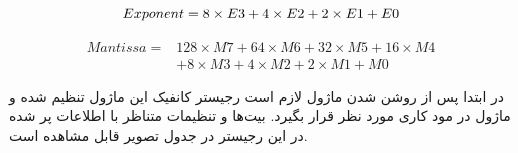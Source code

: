 \begin{fleqn}
	\begin{equation*}
		Exponent = 8\times E3 + 4\times E2 + 2\times E1 + E0\\
	\end{equation*}
\end{fleqn}
\begin{fleqn}
	\begin{equation*}
	\begin{split}
		Mantissa = &128\times M7 + 64\times M6 + 32\times M5 + 16\times M4 \\
					&+ 8\times M3 + 4\times M2 + 2\times M1 + M0
	\end{split}
	\end{equation*}
\end{fleqn}


در ابتدا پس از روشن شدن ماژول لازم است رجیستر‌ کانفیک این ماژول تنظیم شده و ماژول در مود کاری مورد نظر قرار بگیرد. بیت‌ها و تنظیمات متناظر با اطلاعات پر شده در این رجیستر در جدول تصویر  قابل مشاهده است. 

